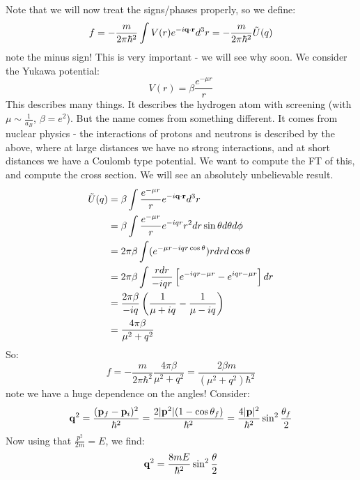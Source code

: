 Note that we will now treat the signs/phases properly, so we define:
\begin{equation}
    f = -\frac{m}{2\pi\hbar^2}\int V(r) e^{-i\mathbf{q} \cdot \mathbf{r}}d^3r = -\frac{m}{2\pi\hbar^2}\tilde{U}(q)
\end{equation}
note the minus sign! This is very important - we will see why soon. We consider the Yukawa potential:
\begin{equation}
    V(r) = \beta\frac{e^{-\mu r}}{r}
\end{equation}
This describes many things. It describes the hydrogen atom with screening (with $\mu \sim \frac{1}{a_B}$, $\beta = e^2$). But the name comes from something different. It comes from nuclear physics - the interactions of protons and neutrons is described by the above, where at large distances we have no strong interactions, and at short distances we have a Coulomb type potential. We want to compute the FT of this, and compute the cross section. We will see an absolutely unbelievable result.
\begin{equation}
    \begin{split}
        \tilde{U}(q) &= \beta \int \frac{e^{-\mu r}}{r}e^{-i\v{q} \cdot \v{r}}d^3 r 
        \\ &= \beta \int \frac{e^{-\mu r}}{r}e^{-iqr}r^2 dr \sin\theta d\theta d\phi  
        \\ &= 2\pi \beta \int (e^{-\mu r - i q r \cos\theta})rdrd\cos\theta 
        \\ &= 2\pi\beta \int \frac{rdr }{-iqr}\left[e^{-iqr - \mu r} - e^{iqr - \mu r}\right]dr
        \\ &= \frac{2\pi\beta}{-iq}\left(\frac{1}{\mu + iq} - \frac{1}{\mu - iq}\right) 
        \\ &= \frac{4\pi\beta}{\mu^2 + q^2}
    \end{split}
\end{equation}
So:
\begin{equation}
    f = -\frac{m}{2\pi\hbar^2}\frac{4\pi\beta}{\mu^2 + q^2} = \frac{2\beta m}{(\mu^2 + q^2)\hbar^2}
\end{equation}
note we have a huge dependence on the angles! Consider:
\begin{equation}
    \mathbf{q}^2 = \frac{(\mathbf{p}_f - \mathbf{p}_i)^2}{\hbar^2} = \frac{2\lvert \mathbf{p}^2 \rvert(1-\cos\theta_f)}{\hbar^2} = \frac{4\lvert \mathbf{p} \rvert^2}{\hbar^2}\sin^2\frac{\theta_f}{2}
\end{equation}
Now using that $\frac{p^2}{2m} = E$, we find:
\begin{equation}
    \mathbf{q}^2 = \frac{8mE}{\hbar^2}\sin^2\frac{\theta}{2}
\end{equation}
